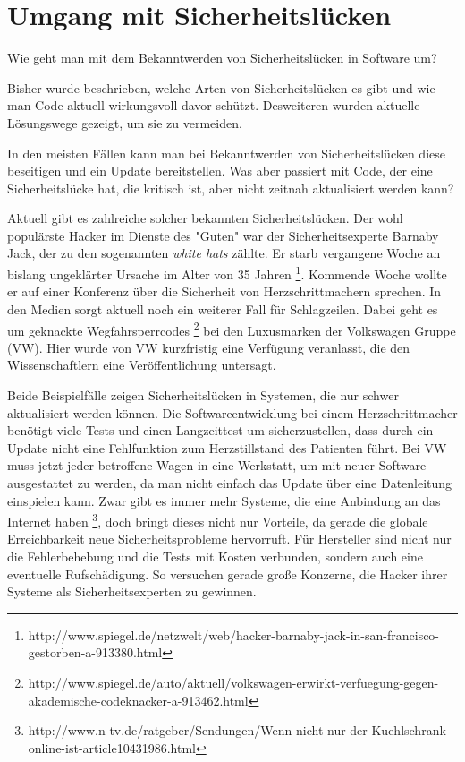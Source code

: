 \section{Umgang mit Sicherheitslücken}
Wie geht man mit dem Bekanntwerden von Sicherheitslücken in Software um?

Bisher wurde beschrieben, welche Arten von Sicherheitslücken es gibt und 
wie man Code aktuell wirkungsvoll davor schützt. Desweiteren wurden aktuelle 
Lösungswege gezeigt, um sie zu vermeiden.

In den meisten Fällen kann man bei Bekanntwerden von Sicherheitslücken
diese beseitigen und ein Update bereitstellen.
Was aber passiert mit Code, der eine Sicherheitslücke hat, die
kritisch ist, aber nicht zeitnah aktualisiert werden kann?

Aktuell gibt es zahlreiche solcher bekannten Sicherheitslücken. Der wohl 
populärste Hacker im Dienste des "Guten" war der Sicherheitsexperte 
Barnaby Jack, der zu den sogenannten \textit{white hats} zählte. Er starb 
vergangene Woche an bislang ungeklärter Ursache im Alter von 35 Jahren
\footnote{http://www.spiegel.de/netzwelt/web/hacker-barnaby-jack-in-san-francisco-gestorben-a-913380.html}. 
Kommende Woche wollte er auf einer Konferenz über die Sicherheit von 
Herzschrittmachern sprechen.
In den Medien sorgt aktuell noch ein weiterer Fall für Schlagzeilen.
Dabei geht es um geknackte Wegfahrsperrcodes
\footnote{http://www.spiegel.de/auto/aktuell/volkswagen-erwirkt-verfuegung-gegen-akademische-codeknacker-a-913462.html} 
bei den Luxusmarken der Volkswagen Gruppe (VW).
Hier wurde von VW kurzfristig eine Verfügung veranlasst, die den Wissenschaftlern
eine Veröffentlichung untersagt.

Beide Beispielfälle zeigen Sicherheitslücken in Systemen, die
nur schwer aktualisiert werden können. 
Die Softwareentwicklung bei einem Herzschrittmacher benötigt viele
Tests und einen Langzeittest um sicherzustellen, dass durch ein Update
nicht eine Fehlfunktion zum Herzstillstand des Patienten führt. 
Bei VW muss jetzt jeder betroffene Wagen in eine Werkstatt, um mit neuer
Software ausgestattet zu werden, da man nicht einfach das Update über 
eine Datenleitung einspielen kann. 
Zwar gibt es immer mehr Systeme, die eine Anbindung an das Internet haben
\footnote{http://www.n-tv.de/ratgeber/Sendungen/Wenn-nicht-nur-der-Kuehlschrank-online-ist-article10431986.html}, 
doch bringt dieses nicht nur Vorteile, da gerade die globale Erreichbarkeit
neue Sicherheitsprobleme hervorruft.  
Für Hersteller sind nicht nur die Fehlerbehebung und die Tests mit 
Kosten verbunden, sondern auch eine eventuelle Rufschädigung. So versuchen
gerade große Konzerne, die Hacker ihrer Systeme als Sicherheitsexperten 
zu gewinnen.

